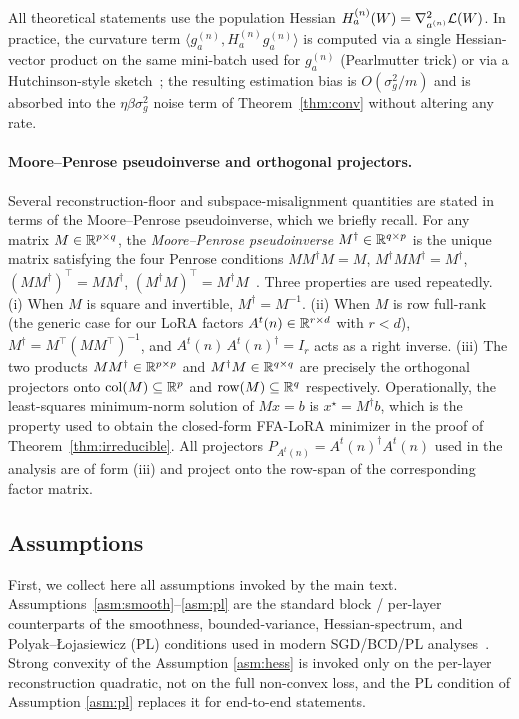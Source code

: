 \begin{remark}\label{rem:hvp}
All theoretical statements use the population Hessian $H_a^{(n)}(W)=\nabla^2_{a^{(n)}}\mathcal{L}(W)$. In practice, the curvature term $\langle g_a^{(n)}, H_a^{(n)} g_a^{(n)}\rangle$ is computed via a single Hessian-vector product on the same mini-batch used for $g_a^{(n)}$ (Pearlmutter trick) or via a Hutchinson-style sketch~\citep{yao2020pyhessian}; the resulting estimation bias is $O(\sigma_g^2/m)$ and is absorbed into the $\eta\beta\sigma_g^2$ noise term of Theorem~\ref{thm:conv} without altering any rate.
\end{remark}

\paragraph{Moore--Penrose pseudoinverse and orthogonal projectors.}
Several reconstruction-floor and subspace-misalignment quantities are stated in terms of the Moore--Penrose pseudoinverse, which we briefly recall. For any matrix $M\in\mathbb{R}^{p\times q}$, the \emph{Moore--Penrose pseudoinverse} $M^\dagger\in\mathbb{R}^{q\times p}$ is the unique matrix satisfying the four Penrose conditions $M M^\dagger M = M$, $M^\dagger M M^\dagger = M^\dagger$, $(M M^\dagger)^\top = M M^\dagger$, $(M^\dagger M)^\top = M^\dagger M$~\citep{penrose1955}. Three properties are used repeatedly. (i) When $M$ is square and invertible, $M^\dagger = M^{-1}$. (ii) When $M$ is row full-rank (the generic case for our LoRA factors $A^t(n)\in\mathbb{R}^{r\times d}$ with $r<d$), $M^\dagger = M^\top(MM^\top)^{-1}$, and $A^t(n)\,A^t(n)^\dagger = I_r$ acts as a right inverse. (iii) The two products $M M^\dagger\in\mathbb{R}^{p\times p}$ and $M^\dagger M\in\mathbb{R}^{q\times q}$ are precisely the orthogonal projectors onto $\mathrm{col}(M)\subseteq\mathbb{R}^p$ and $\mathrm{row}(M)\subseteq\mathbb{R}^q$ respectively. Operationally, the least-squares minimum-norm solution of $Mx=b$ is $x^\star = M^\dagger b$, which is the property used to obtain the closed-form FFA-LoRA minimizer in the proof of Theorem~\ref{thm:irreducible}. All projectors $P_{A^t(n)}=A^t(n)^\dagger A^t(n)$ used in the analysis are of form (iii) and project onto the row-span of the corresponding factor matrix.



\subsection{Assumptions}
First, we collect here all assumptions invoked by the main text. Assumptions~\ref{asm:smooth}--\ref{asm:pl} are the standard block / per-layer counterparts of the smoothness, bounded-variance, Hessian-spectrum, and Polyak--{\L}ojasiewicz (PL) conditions used in modern SGD/BCD/PL analyses~\cite{nesterov2012bcd,karimi2016pl}. Strong convexity of the Assumption \ref{asm:hess} is invoked only on the per-layer reconstruction quadratic, not on the full non-convex loss, and the PL condition of Assumption \ref{asm:pl} replaces it for end-to-end statements.


